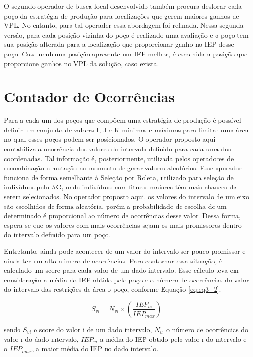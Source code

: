 O segundo operador de busca local desenvolvido também procura deslocar cada poço da estratégia de produção para localizações que gerem maiores ganhos de VPL. No entanto, para tal operador essa abordagem foi refinada. Nessa segunda versão, para cada posição vizinha do poço é realizado uma avaliação e o poço tem sua posição alterada para a localização que proporcionar ganho no IEP desse poço. Caso nenhuma posição apresente um IEP melhor, é escolhida a posição que proporcione ganhos no VPL da solução, caso exista. 

\section{Contador de Ocorrências}
\label{ch:3_ContadorOcorrencias}  
Para a cada um dos poços que compõem uma estratégia de produção é possível definir um conjunto de valores I, J e K mínimos e máximos para limitar uma área no qual esses poços podem ser posicionados. O operador proposto aqui contabiliza a ocorrência dos valores do intervalo definido para cada uma das coordenadas. Tal informação é, posteriormente, utilizada pelos operadores de recombinação e mutação no momento de gerar valores aleatórios. Esse operador funciona de forma semelhante à Seleção por Roleta, utilizado para seleção de indivíduos pelo AG, onde indivíduos com fitness maiores têm mais chances de serem selecionados. No operador proposto aqui, os valores do intervalo de um eixo são escolhidos de forma aleatória, porém a probabilidade de escolha de um determinado é proporcional ao número de ocorrências desse valor. Dessa forma, espera-se que os valores com mais ocorrências sejam os mais promissores dentro do intervalo definido para um poço.

Entretanto, ainda pode acontecer de um valor do intervalo ser pouco promissor e ainda ter um alto número de ocorrências. Para contornar essa situação, é calculado um score para cada valor de um dado intervalo. Esse cálculo leva em consideração a média do IEP obtido pelo poço e o número de ocorrências do valor do intervalo das restrições de área o poço, conforme Equação \ref{eq:eq3_2}.

\begin{equation}
  \label{eq:eq3_2}
  S_{vi} = N_{vi} \times (\frac{IEP_{vi}}{IEP_{max}})
\end{equation}
  
sendo $S_{vi}$ o score do valor i de um dado intervalo, $N_{vi}$ o número de ocorrências do valor i do dado intervalo, $IEP_{vi}$ a média do IEP obtido pelo valor i do intervalo e o $IEP_{max}$, a maior média do IEP no dado intervalo. 

